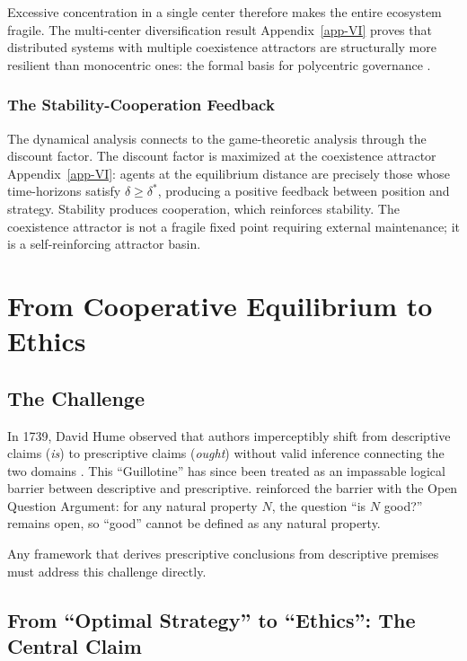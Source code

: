 \documentclass[11pt]{article}
\theoremstyle{plain}
\theoremstyle{definition}
\theoremstyle{remark}
\let\origsection\section
\renewcommand{\section}{\needspace{12\baselineskip}\origsection}
\let\origsubsection\subsection
\renewcommand{\subsection}{\needspace{7\baselineskip}\origsubsection}
\let\origsubsubsection\subsubsection
\renewcommand{\subsubsection}{\needspace{4\baselineskip}\origsubsubsection}
\begin{document}
Excessive concentration in a single center therefore makes the entire
ecosystem fragile. The multi-center diversification result
Appendix~\ref{app-VI} proves that distributed systems with multiple
coexistence attractors are structurally more resilient than monocentric
ones: the formal basis for polycentric governance
\citep{Ostrom1990, Ostrom2005}.

\subsubsection{The Stability-Cooperation
Feedback}\label{the-stability-cooperation-feedback}

The dynamical analysis connects to the game-theoretic analysis through
the discount factor. The discount factor is maximized at the coexistence
attractor Appendix~\ref{app-VI}: agents at the equilibrium distance are
precisely those whose time-horizons satisfy \(\delta \geq \delta^*\),
producing a positive feedback between position and strategy. Stability
produces cooperation, which reinforces stability. The coexistence
attractor is not a fragile fixed point requiring external maintenance;
it is a self-reinforcing attractor basin.

\section{From Cooperative Equilibrium to
Ethics}\label{from-cooperative-equilibrium-to-ethics}

\subsection{The Challenge}\label{the-challenge}

In 1739, David Hume observed that authors imperceptibly shift from
descriptive claims (\emph{is}) to prescriptive claims (\emph{ought})
without valid inference connecting the two domains
\citep[3.1.1]{Hume1739}. This ``Guillotine'' has since been treated as
an impassable logical barrier between descriptive and prescriptive.
\citet{Moore1903} reinforced the barrier with the Open Question
Argument: for any natural property \(N\), the question ``is \(N\)
good?'' remains open, so ``good'' cannot be defined as any natural
property.

Any framework that derives prescriptive conclusions from descriptive
premises must address this challenge directly.

\subsection{From ``Optimal Strategy'' to ``Ethics'': The Central
Claim}\label{from-optimal-strategy-to-ethics-the-central-claim}
\end{document}
